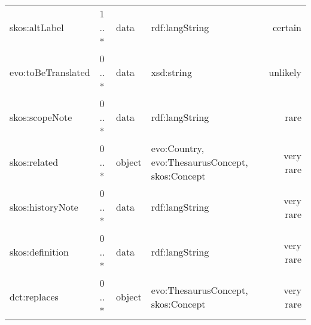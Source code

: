 \documentclass[10pt,a4paper,titlepage,final]{article}
\begin{document}
\begin{tabularx}{\textwidth}{lllXr}
          skos:altLabel &      1 .. * &    data &                                     rdf:langString &    certain \\
     evo:toBeTranslated &      0 .. * &    data &                                         xsd:string &   unlikely \\
         skos:scopeNote &      0 .. * &    data &                                     rdf:langString &       rare \\
           skos:related &      0 .. * &  object &    evo:Country, evo:ThesaurusConcept, skos:Concept &  very rare \\
       skos:historyNote &      0 .. * &    data &                                     rdf:langString &  very rare \\
        skos:definition &      0 .. * &    data &                                     rdf:langString &  very rare \\
           dct:replaces &      0 .. * &  object &                 evo:ThesaurusConcept, skos:Concept &  very rare \\
\end{tabularx}
\end{document}
